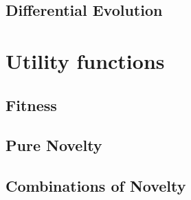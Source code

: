 \subsection{Differential Evolution}


\section{Utility functions}
\subsection{Fitness}
\subsection{Pure Novelty}
\subsection{Combinations of Novelty}
